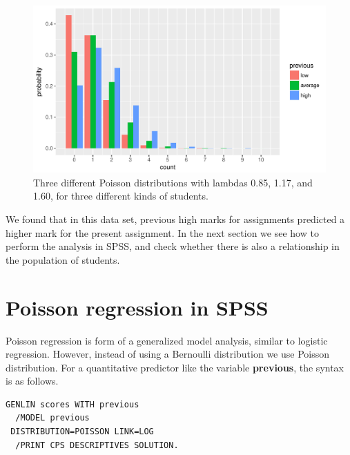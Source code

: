 \documentclass[]{report}\usepackage[]{graphicx}\usepackage[]{color}
\makeatletter
\def\maxwidth{ %
  \ifdim\Gin@nat@width>\linewidth
    \linewidth
  \else
    \Gin@nat@width
  \fi
}
\newenvironment{knitrout}{}{} %
\makeatother
\begin{document}
\begin{knitrout}
\color{fgcolor}\begin{figure}

{\centering \includegraphics[width=\maxwidth]{figure/gen_19-1} 

}

\caption[Three different Poisson distributions with lambdas 0.85, 1.17, and 1.60, for three different kinds of students]{Three different Poisson distributions with lambdas 0.85, 1.17, and 1.60, for three different kinds of students.}\label{fig:gen_19}
\end{figure}


\end{knitrout}



We found that in this data set, previous high marks for assignments predicted a higher mark for the present assignment. In the next section we see how to perform the analysis in SPSS, and check whether there is also a relationship in the population of students.

\section{Poisson regression in SPSS}

Poisson regression is form of a generalized model analysis, similar to logistic regression. However, instead of using a Bernoulli distribution we use Poisson distribution. For a quantitative predictor like the variable \textbf{previous}, the syntax is as follows.

\begin{verbatim}
GENLIN scores WITH previous
  /MODEL previous
 DISTRIBUTION=POISSON LINK=LOG
  /PRINT CPS DESCRIPTIVES SOLUTION.
\end{verbatim}
\end{document}
